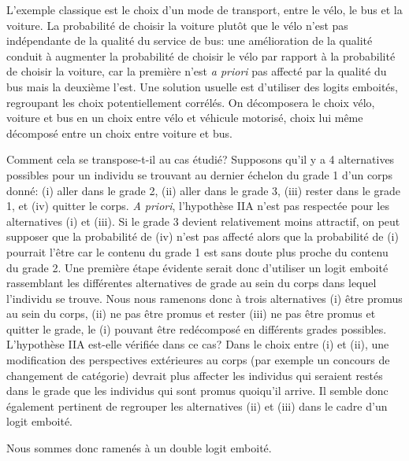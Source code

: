 \documentclass[11pt,a4paper]{article}
\begin{document}
L'exemple classique est le choix d'un mode de transport, entre le vélo, le bus et la voiture. La probabilité de choisir la voiture plutôt que le vélo n'est pas indépendante de la qualité du service de bus: une amélioration de la qualité conduit à augmenter la probabilité de choisir le vélo par rapport à la probabilité de choisir la voiture, car la première n'est \textit{a priori} pas affecté par la qualité du bus mais la deuxième l'est. Une solution usuelle est d'utiliser des logits emboités, regroupant les choix potentiellement corrélés. On décomposera le choix vélo, voiture et bus en un choix entre vélo et véhicule motorisé, choix lui même décomposé entre un choix entre voiture et bus. 


Comment cela se transpose-t-il au cas étudié? Supposons qu'il y a 4 alternatives possibles pour un individu se trouvant au dernier échelon du grade 1 d'un corps donné: (i) aller dans le grade 2, (ii) aller dans le grade 3, (iii) rester dans le grade 1, et (iv) quitter le corps. \textit{A priori}, l'hypothèse IIA n'est pas respectée pour les alternatives (i) et (iii). Si le grade 3 devient relativement moins attractif, on peut supposer que la probabilité de (iv) n'est pas affecté alors que la probabilité de (i) pourrait l'être car le contenu du grade 1 est sans doute plus proche du contenu du grade 2. Une première étape évidente serait donc d'utiliser un logit emboité rassemblant les différentes alternatives de grade au sein du corps dans lequel l'individu se trouve. Nous nous ramenons donc à trois alternatives (i) être promus au sein du corps, (ii) ne pas être promus et rester (iii) ne pas être promus et quitter le grade, le (i) pouvant être redécomposé en différents grades possibles. 
L'hypothèse IIA est-elle vérifiée dans ce cas? Dans le choix entre (i) et (ii), une modification des perspectives extérieures au corps (par exemple un concours de changement de catégorie) devrait plus affecter les individus qui seraient restés dans le grade que les individus qui sont promus quoiqu'il arrive. Il semble donc également pertinent de regrouper les alternatives (ii) et (iii) dans le cadre d'un logit emboité. 

Nous sommes donc ramenés à un double logit emboité. 



\end{document}
